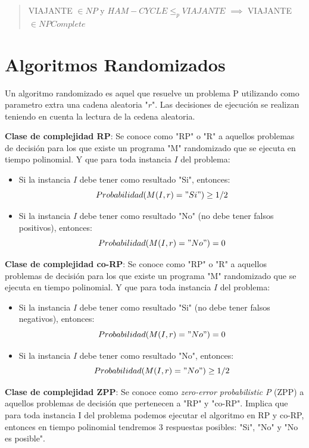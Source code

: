 \documentclass{article}
\begin{document}
\begin{quote}
    VIAJANTE \(\in NP\) y \(HAM-CYCLE \leq_p VIAJANTE\) \(\implies\) VIAJANTE \(\in NPComplete\)
\end{quote}

\newpage
\section{Algoritmos Randomizados}

Un algoritmo randomizado es aquel que resuelve un problema P utilizando 
como parametro extra una cadena aleatoria "\(r\)". Las decisiones de ejecución
se realizan teniendo en cuenta la lectura de la cedena aleatoria.

\textbf{Clase de complejidad RP}: Se conoce como "RP" o "R" a aquellos problemas de decisión
para los que existe un programa "M" randomizado que se ejecuta en tiempo polinomial. Y que para 
toda instancia \(I\) del problema:
\begin{itemize}
    \item Si la instancia \(I\) debe tener como resultado "Si", entonces:
     \[
         Probabilidad(M(I,r)="Si")\geq 1/2
     \] 
    \item Si la instancia \(I\) debe tener como resultado "No" (no debe tener falsos positivos), entonces:
    \[
        Probabilidad(M(I,r)="No") = 0
    \] 
    
\end{itemize}

\textbf{Clase de complejidad co-RP}: Se conoce como "RP" o "R" a aquellos problemas de decisión
para los que existe un programa "M" randomizado que se ejecuta en tiempo polinomial. Y que para 
toda instancia \(I\) del problema:
\begin{itemize}
    \item Si la instancia \(I\) debe tener como resultado "Si" (no debe tener falsos negativos), entonces:
     \[
         Probabilidad(M(I,r)="No") = 0
     \] 
    \item Si la instancia \(I\) debe tener como resultado "No", entonces:
    \[
        Probabilidad(M(I,r)="No") \geq 1/2
    \]
\end{itemize}

\textbf{Clase de complejidad ZPP}: Se conoce como \textit{zero-error probabilistic P} (ZPP) a aquellos
problemas de decisión que pertenecen a "RP" y "co-RP". Implica que para toda instancia I del problema
podemos ejecutar el algoritmo en RP y co-RP, entonces en tiempo polinomial tendremos 3 respuestas posibles:
"Si", "No" y "No es posible".
\end{document}

